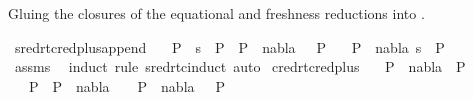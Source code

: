 \begin{isabellebody}
\endisatagproof
{\isafoldproof}%
%
\isadelimproof
%
\endisadelimproof
%
\begin{isamarkuptext}%
Gluing the closures of the equational and freshness reductions into .%
\end{isamarkuptext}\isamarkuptrue%
\isamarkupfalse%
\ sred{\isacharunderscore}{\kern0pt}rtc{\isacharunderscore}{\kern0pt}red{\isacharunderscore}{\kern0pt}plus{\isacharunderscore}{\kern0pt}append{\isacharcolon}{\kern0pt}\isanewline
\ \ \ {\isachardoublequoteopen}P{}\ {\isasymturnstile}\ s\ {\isasymleadsto}\isactrlsup {\isacharasterisk}{\kern0pt}\ P{}{\isachardoublequoteclose}\ \ {\isachardoublequoteopen}P{}\ {\isasymTurnstile}\ {\isacharparenleft}{\kern0pt}nabla{\isacharcomma}{\kern0pt}\ {\isacharbrackleft}{\kern0pt}{\isacharbrackright}{\kern0pt}{\isacharparenright}{\kern0pt}\ {\isasymRightarrow}\ P{}{\isachardoublequoteclose}\isanewline
\ \ \ {\isachardoublequoteopen}P{}\ {\isasymTurnstile}\ {\isacharparenleft}{\kern0pt}nabla{\isacharcomma}{\kern0pt}\ s{\isacharparenright}{\kern0pt}\ {\isasymRightarrow}\ P{}{\isachardoublequoteclose}\isanewline
%
\isadelimproof
\ \ %
\endisadelimproof
%
\isatagproof
{}\isamarkupfalse%
\ assms\ \isamarkupfalse%
\ {\isacharparenleft}{\kern0pt}induct\ rule{\isacharcolon}{\kern0pt}\ sred{\isacharunderscore}{\kern0pt}rtc{\isachardot}{\kern0pt}induct{\isacharparenright}{\kern0pt}\ auto%
\endisatagproof
{\isafoldproof}%
%
\isadelimproof
\isanewline
%
\endisadelimproof
\isanewline
{}\isamarkupfalse%
\ cred{\isacharunderscore}{\kern0pt}rtc{\isacharunderscore}{\kern0pt}red{\isacharunderscore}{\kern0pt}plus{\isacharcolon}{\kern0pt}\isanewline
\ \ \ {\isachardoublequoteopen}P{}\ {\isasymturnstile}\ nabla\ {\isasymrightarrow}\isactrlsup {\isacharasterisk}{\kern0pt}\ P{}{\isachardoublequoteclose}\isanewline
\ \ \ {\isachardoublequoteopen}{\isacharparenleft}{\kern0pt}P{}\ {\isacharequal}{\kern0pt}\ P{}\ {\isasymand}\ nabla\ {\isacharequal}{\kern0pt}\ {\isacharbraceleft}{\kern0pt}{\isacharbraceright}{\kern0pt}{\isacharparenright}{\kern0pt}\ {\isasymor}\ P{}\ {\isasymTurnstile}\ {\isacharparenleft}{\kern0pt}nabla{\isacharcomma}{\kern0pt}\ {\isacharbrackleft}{\kern0pt}{\isacharbrackright}{\kern0pt}{\isacharparenright}{\kern0pt}\ {\isasymRightarrow}\ P{}{\isachardoublequoteclose}\isanewline

\end{isabellebody}
